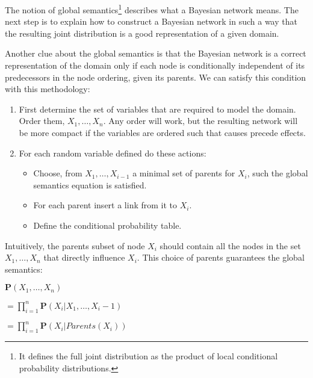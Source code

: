 The notion of global semantics\footnote{It defines the full joint distribution as the product of local conditional probability distributions.} describes what a Bayesian network means.
The next step is to explain how to construct a Bayesian network in such a way that the resulting joint distribution is a good representation of a given domain. \vspace{7pt}

Another clue about the global semantics is that the Bayesian network is a correct representation of the domain only if each node is conditionally independent
of its predecessors in the node ordering, given its parents. We can satisfy this condition with this methodology:
\begin{enumerate}
    \item First determine the set of variables that are required to model the domain. Order them, ${X_1, \dots, X_n}$. Any order will work, but the resulting network will be more compact if the variables are ordered such that causes precede effects.
    \item For each random variable defined do these actions:
    \begin{itemize}
        \renewcommand{\labelitemi}{-} 
        \item Choose, from $X_1, \dots, X_{i-1}$ a minimal set of parents for $X_i$, such the global semantics equation is satisfied.
        \item For each parent insert a link from it to $X_i$.
        \item Define the conditional probability table.
    \end{itemize}
\end{enumerate}
Intuitively, the parents subset of node $X_i$ should contain all the nodes in the set $X_1, \dots, X_n$ that directly influence $X_i$. This choice of parents guarantees the global
semantics:
\begin{center}
    $\mathbf{P}(X_1, \dots, X_n)$
    
    $ = \prod_{i=1}^{n} \mathbf{P}(X_i|X_1, \dots, X_i-1)$

    $= \prod_{i=1}^{n} \mathbf{P}(X_i|Parents(X_i))$
\end{center}
